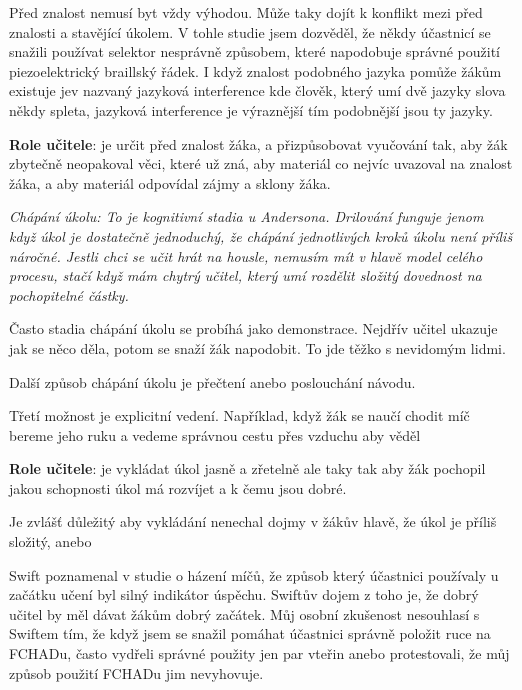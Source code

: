 Před znalost nemusí byt vždy výhodou. Může taky dojít k konflikt mezi před znalosti a stavějící úkolem. V tohle studie jsem dozvěděl, že někdy účastnicí se snažili používat selektor nesprávně způsobem, které napodobuje správné použití piezoelektrický braillský řádek.  I když znalost podobného jazyka pomůže žákům existuje jev nazvaný jazyková interference kde člověk, který umí dvě jazyky slova někdy spleta, jazyková interference je výraznější tím podobnější jsou ty jazyky\citep{brauer1998stroop}.

{\bf Role učitele}: je určit před znalost žáka, a přizpůsobovat vyučování tak, aby žák zbytečně neopakoval věci, které už zná, aby materiál co nejvíc uvazoval na znalost žáka, a aby materiál odpovídal zájmy a sklony žáka.

\em Chápání úkolu\em : To je kognitivní stadia u Andersona. Drilování funguje jenom když úkol je dostatečně jednoduchý, že chápání jednotlivých kroků úkolu není příliš náročné.  Jestli chci se učit hrát na housle, nemusím mít v hlavě model celého procesu, stačí když mám chytrý učitel, který umí rozdělit složitý dovednost na pochopitelné částky.

Často stadia chápání úkolu se probíhá jako demonstrace.  Nejdřív učitel ukazuje jak se něco děla, potom se snaží žák napodobit.  To jde těžko s nevidomým lidmi.

Další způsob chápání úkolu je přečtení anebo poslouchání návodu.

Třetí možnost je explicitní vedení.  Například, když žák se naučí chodit míč bereme jeho ruku a vedeme správnou cestu přes vzduchu aby věděl 

{\bf Role učitele}: je vykládat úkol jasně a zřetelně ale taky tak aby žák pochopil jakou schopnosti úkol má rozvíjet a k čemu jsou dobré.

Je zvlášť důležitý aby vykládání nenechal dojmy v žákův hlavě, že úkol je příliš složitý, anebo 

Swift poznamenal v studie o házení míčů, že způsob který účastnici používaly u začátku učení byl silný indikátor úspěchu. Swiftův dojem z toho je, že dobrý učitel by měl dávat žákům dobrý začátek.  \citep[str. 215]{swift1903studies}  Můj osobní zkušenost nesouhlasí s Swiftem tím, že když jsem se snažil pomáhat účastnici správně položit ruce na FCHADu, často vydřeli správné použity jen par vteřin anebo protestovali, že můj způsob použití FCHADu jim nevyhovuje.

